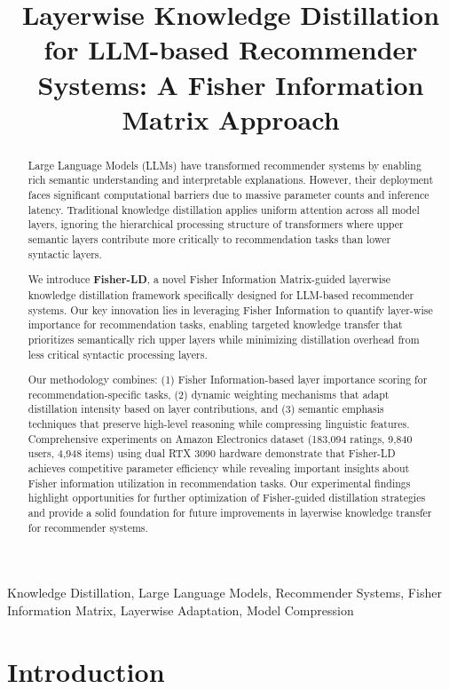 \documentclass[10pt,conference]{IEEEtran}
\title{Layerwise Knowledge Distillation for LLM-based Recommender Systems: A Fisher Information Matrix Approach}
\author{
\IEEEauthorblockN{Zhaohui Wang}
\IEEEauthorblockA{USC Viterbi School of Engineering\\
University of Southern California\\
Los Angeles, CA, USA\\
Email: zwang000@usc.edu}
}
\begin{document}
\maketitle

\begin{abstract}
Large Language Models (LLMs) have transformed recommender systems by enabling rich semantic understanding and interpretable explanations. However, their deployment faces significant computational barriers due to massive parameter counts and inference latency. Traditional knowledge distillation applies uniform attention across all model layers, ignoring the hierarchical processing structure of transformers where upper semantic layers contribute more critically to recommendation tasks than lower syntactic layers.

We introduce \textbf{Fisher-LD}, a novel Fisher Information Matrix-guided layerwise knowledge distillation framework specifically designed for LLM-based recommender systems. Our key innovation lies in leveraging Fisher Information to quantify layer-wise importance for recommendation tasks, enabling targeted knowledge transfer that prioritizes semantically rich upper layers while minimizing distillation overhead from less critical syntactic processing layers.

Our methodology combines: (1) Fisher Information-based layer importance scoring for recommendation-specific tasks, (2) dynamic weighting mechanisms that adapt distillation intensity based on layer contributions, and (3) semantic emphasis techniques that preserve high-level reasoning while compressing linguistic features. Comprehensive experiments on Amazon Electronics dataset (183,094 ratings, 9,840 users, 4,948 items) using dual RTX 3090 hardware demonstrate that Fisher-LD achieves competitive parameter efficiency while revealing important insights about Fisher information utilization in recommendation tasks. Our experimental findings highlight opportunities for further optimization of Fisher-guided distillation strategies and provide a solid foundation for future improvements in layerwise knowledge transfer for recommender systems.
\end{abstract}

\begin{IEEEkeywords}
Knowledge Distillation, Large Language Models, Recommender Systems, Fisher Information Matrix, Layerwise Adaptation, Model Compression
\end{IEEEkeywords}

\section{Introduction}
\end{document}
